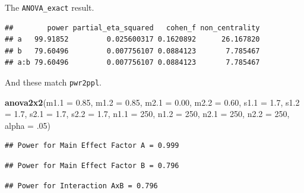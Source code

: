 \documentclass[
]{book}
\newenvironment{Shaded}{\begin{snugshade}}{\end{snugshade}}
\newcommand{\DataTypeTok}[1]{\textcolor[rgb]{0.13,0.29,0.53}{#1}}
\newcommand{\DecValTok}[1]{\textcolor[rgb]{0.00,0.00,0.81}{#1}}
\newcommand{\FloatTok}[1]{\textcolor[rgb]{0.00,0.00,0.81}{#1}}
\newcommand{\KeywordTok}[1]{\textcolor[rgb]{0.13,0.29,0.53}{\textbf{#1}}}
\newcommand{\NormalTok}[1]{#1}
\newcommand{\OperatorTok}[1]{\textcolor[rgb]{0.81,0.36,0.00}{\textbf{#1}}}
\newcommand{\OtherTok}[1]{\textcolor[rgb]{0.56,0.35,0.01}{#1}}
\newcommand{\StringTok}[1]{\textcolor[rgb]{0.31,0.60,0.02}{#1}}
\begin{document}
The \texttt{ANOVA\_exact} result.

\begin{Shaded}
\end{Shaded}

\begin{verbatim}
##        power partial_eta_squared   cohen_f non_centrality
## a   99.91852         0.025600317 0.1620892      26.167820
## b   79.60496         0.007756107 0.0884123       7.785467
## a:b 79.60496         0.007756107 0.0884123       7.785467
\end{verbatim}

And these match \texttt{pwr2ppl}.

\begin{Shaded}
\begin{Highlighting}[]
\KeywordTok{anova2x2}\NormalTok{(}\DataTypeTok{m1.1 =} \FloatTok{0.85}\NormalTok{, }\DataTypeTok{m1.2 =} \FloatTok{0.85}\NormalTok{, }\DataTypeTok{m2.1 =} \FloatTok{0.00}\NormalTok{, }\DataTypeTok{m2.2 =} \FloatTok{0.60}\NormalTok{,}
         \DataTypeTok{s1.1 =} \FloatTok{1.7}\NormalTok{, }\DataTypeTok{s1.2 =} \FloatTok{1.7}\NormalTok{, }\DataTypeTok{s2.1 =} \FloatTok{1.7}\NormalTok{, }\DataTypeTok{s2.2 =} \FloatTok{1.7}\NormalTok{,}
         \DataTypeTok{n1.1 =} \DecValTok{250}\NormalTok{, }\DataTypeTok{n1.2 =} \DecValTok{250}\NormalTok{, }\DataTypeTok{n2.1 =} \DecValTok{250}\NormalTok{, }\DataTypeTok{n2.2 =} \DecValTok{250}\NormalTok{,}
         \DataTypeTok{alpha =} \FloatTok{.05}\NormalTok{)}
\end{Highlighting}
\end{Shaded}

\begin{verbatim}
## Power for Main Effect Factor A = 0.999
\end{verbatim}

\begin{verbatim}
## Power for Main Effect Factor B = 0.796
\end{verbatim}

\begin{verbatim}
## Power for Interaction AxB = 0.796
\end{verbatim}
\end{document}
